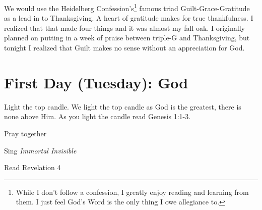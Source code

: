 We would use the Heidelberg Confession's\footnote{While I don't follow a confession, I greatly enjoy reading and learning from them.  I just feel God's Word is the only thing I owe allegiance to.} famous triad Guilt-Grace-Gratitude as a lead in to Thanksgiving.  A heart of gratitude makes for true thankfulness.  I realized that that made four things and it was almost my fall oak.  I originally planned on putting in a week of praise between triple-G and Thanksgiving, but tonight I realized that Guilt makes no sense without an appreciation for God.


\section{First Day (Tuesday): God}
\noindent Light the top candle.  We light the top candle as God is the greatest, there is none above Him.  As you light the candle read Genesis 1:1-3.



\noindent Pray together


\noindent Sing \emph{Immortal Invisible}



\noindent Read Revelation 4

